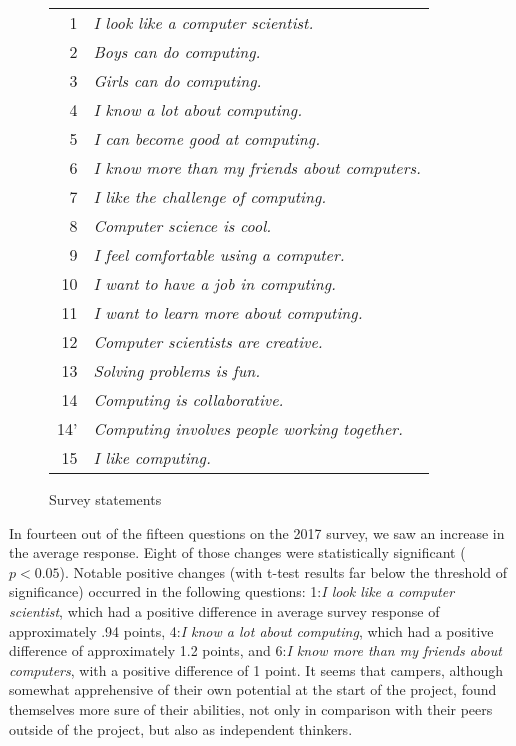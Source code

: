 \begin{figure}
{\small
\begin{tabular}{r|l}
 1 & \textit{I look like a computer scientist.} \\
 2 & \textit{Boys can do computing.} \\
 3 & \textit{Girls can do computing.} \\
 4 & \textit{I know a lot about computing.} \\
 5 & \textit{I can become good at computing.} \\
 6 & \textit{I know more than my friends about computers.} \\
 7 & \textit{I like the challenge of computing.} \\
 8 & \textit{Computer science is cool.} \\
 9 & \textit{I feel comfortable using a computer.} \\
10 & \textit{I want to have a job in computing.} \\
11 & \textit{I want to learn more about computing.} \\
12 & \textit{Computer scientists are creative.} \\
13 & \textit{Solving problems is fun.} \\
14 & \textit{Computing is collaborative.} \\
14' & \textit{Computing involves people working together.} \\
15 & \textit{I like computing.} 
\end{tabular}
}
\caption{Survey statements}
\end{figure}

In fourteen out of the fifteen questions on the 2017 survey, we saw
an increase in the average response.  Eight of those changes were
statistically significant ($p < 0.05$). Notable positive changes
(with t-test results far below the threshold of significance)
occurred in the following questions: 1:\textit{I look like a computer
scientist}, which had a positive difference in average survey
response of approximately .94 points, 4:\textit{I know a lot about
computing}, which had a positive difference of approximately 1.2
points, and 6:\textit{I know more than my friends about computers},
with a positive difference of 1 point.  It seems that campers,
although somewhat apprehensive of their own potential at the start
of the project, found themselves more sure of their abilities, not
only in comparison with their peers outside of the project, but
also as independent thinkers.

